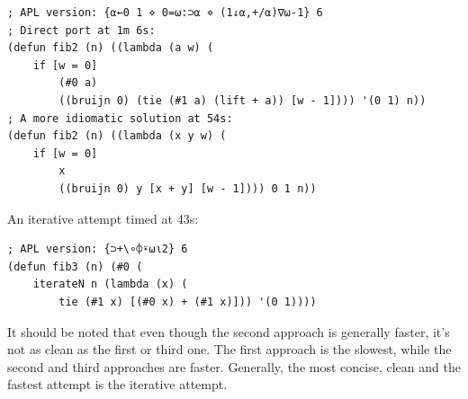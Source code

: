 \begin{verbatim}
; APL version: {⍺←0 1 ⋄ 0=⍵:⊃⍺ ⋄ (1↓⍺,+/⍺)∇⍵-1} 6
; Direct port at 1m 6s:
(defun fib2 (n) ((lambda (a w) (
    if [w = 0]
        (#0 a)
        ((bruijn 0) (tie (#1 a) (lift + a)) [w - 1]))) '(0 1) n))
; A more idiomatic solution at 54s:
(defun fib2 (n) ((lambda (x y w) (
    if [w = 0]
        x
        ((bruijn 0) y [x + y] [w - 1]))) 0 1 n))
\end{verbatim}

\par An iterative attempt timed at 43s:

\begin{verbatim}
; APL version: {⊃+\∘⌽⍣⍵⍳2} 6
(defun fib3 (n) (#0 (
    iterateN n (lambda (x) (
        tie (#1 x) [(#0 x) + (#1 x)])) '(0 1))))
\end{verbatim}

\par It should be noted that even though the second approach is generally faster, it's not as clean as the first or third one. The first approach is the slowest, while the second and third approaches are faster. Generally, the most concise, clean and the fastest attempt is the iterative attempt.
